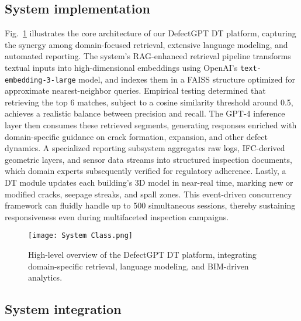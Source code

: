 \documentclass[a4paper,fleqn]{cas-sc}
\begin{document}
\subsection{System implementation}

Fig.~\ref{fig:enter-label2} illustrates the core architecture of our DefectGPT DT platform, capturing the synergy among domain-focused retrieval, extensive language modeling, and automated reporting. The system's RAG-enhanced retrieval pipeline transforms textual inputs into high-dimensional embeddings using OpenAI's \texttt{text-embedding-3-large} model, and indexes them in a FAISS structure optimized for approximate nearest-neighbor queries. Empirical testing determined that retrieving the top 6 matches, subject to a cosine similarity threshold around 0.5, achieves a realistic balance between precision and recall. The GPT-4 inference layer then consumes these retrieved segments, generating responses enriched with domain-specific guidance on crack formation, expansion, and other defect dynamics. A specialized reporting subsystem aggregates raw logs, IFC-derived geometric layers, and sensor data streams into structured inspection documents, which domain experts subsequently verified for regulatory adherence. Lastly, a DT module updates each building's 3D model in near-real time, marking new or modified cracks, seepage streaks, and spall zones. This event-driven concurrency framework can fluidly handle up to 500 simultaneous sessions, thereby sustaining responsiveness even during multifaceted inspection campaigns.



\begin{figure}[h]
    \centering
    \texttt{[image: System Class.png]}
    \caption{High-level overview of the DefectGPT DT platform, integrating domain-specific retrieval, language modeling, and BIM-driven analytics.}
    \label{fig:enter-label2}
\end{figure}

\subsection{System integration}
\end{document}
